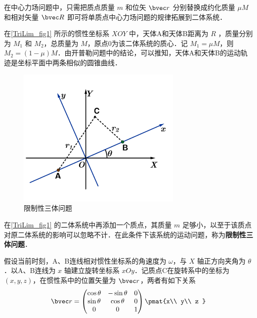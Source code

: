 

在中心力场问题中，只需把质点质量 $m$ 和位矢 $\bvec r$ 分别替换成约化质量 $\mu M$ 和相对矢量 $\bvec R$ 即可将单质点中心力场问题的规律拓展到二体系统．

在\autoref{TriLim_fig1}  所示的惯性坐标系 $XOY$ 中，天体A和天体B距离为 $R$ ，质量分别为 $M_1$ 和 $M_2$，总质量为 $M$，原点$0$为该二体系统的质心．记 $M_1=\mu M$，则 $M_2=(1-\mu)M$．由开普勒问题中的结论，可以推知，天体A和天体B的运动轨迹是坐标平面中两条相似的圆锥曲线．
\begin{figure}[ht]
\centering
\includegraphics[width=8cm]{./figures/TriLim1.pdf}
\caption{限制性三体问题} \label{TriLim_fig1}
\end{figure}

在\autoref{TriLim_fig1}  的二体系统中再添加一个质点，其质量 $m$ 足够小，以至于该质点对原二体系统的影响可以忽略不计．在此条件下该系统的运动问题，称为\textbf{限制性三体问题}．

假设当前时刻，A、B连线相对惯性坐标系的角速度为 $\omega$，与 $X$ 轴正方向夹角为 $\theta$．以A、B连线为 $x$ 轴建立旋转坐标系 $xOy$．记质点C在旋转系中的坐标为 $(x,y,z)$，在惯性系中的位置矢量为 $\bvec r$，两者有如下关系
\begin{equation}%
\bvec r=
\begin{pmatrix}
\cos\theta &-\sin\theta &0 \\
\sin\theta &\cos\theta  &0 \\
0               &0                 &1  \\
\end{pmatrix} 
\pmat{x\\ y\\ z }
\end{equation}

